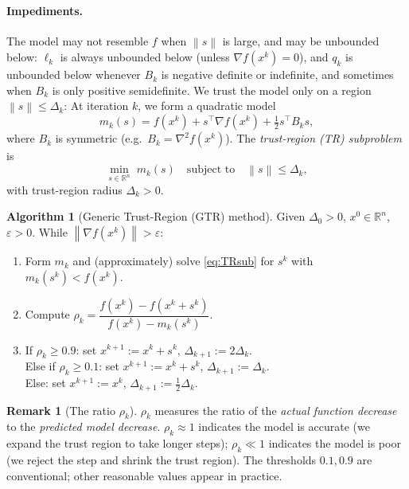 \documentclass[11pt,a4paper]{report}
\theoremstyle{plain}
\theoremstyle{definition}
\newtheorem{remark}[theorem]{Remark}
\newtheorem{algorithm}[theorem]{Algorithm}
\newcommand{\R}{\mathbb{R}}
\newcommand{\norm}[1]{\left\lVert#1\right\rVert}
\newcommand{\grad}{\nabla}
\newcommand{\hess}{\nabla^{2}}
\newcommand{\trans}{^{\top}}
\newcommand{\eps}{\varepsilon}
\begin{document}
\paragraph{Impediments.} The model may not resemble $f$ when $\norm{s}$ is large,
and may be unbounded below: $\ell_{k}$ is always unbounded below (unless
$\grad f(x^{k})=0$), and $q_{k}$ is unbounded below whenever $B_{k}$ is negative
definite or indefinite, and sometimes when $B_{k}$ is only positive
semidefinite. We trust the model only on a region $\norm{s}\le\Delta_{k}$:
At iteration $k$, we form a quadratic model
\begin{equation}\label{eq:TRmodel}
m_{k}(s)=f(x^{k})+s\trans\grad f(x^{k})+\tfrac12 s\trans B_{k}s,
\end{equation}
where $B_{k}$ is symmetric (e.g.\ $B_{k}=\hess f(x^{k})$). The
\emph{trust-region (TR) subproblem} is
\begin{equation}\label{eq:TRsub}\tag{TR}
\min_{s\in\R^{n}}\; m_{k}(s) \quad\text{subject to}\quad \norm{s}\le\Delta_{k},
\end{equation}
with trust-region radius $\Delta_{k}>0$.

\begin{algorithm}[Generic Trust-Region (GTR) method]\label{alg:GTR}
Given $\Delta_{0}>0$, $x^{0}\in\R^{n}$, $\eps>0$. While $\norm{\grad f(x^{k})}>\eps$:
\begin{enumerate}[leftmargin=2em,itemsep=0pt]
  \item Form $m_{k}$ and (approximately) solve \eqref{eq:TRsub} for $s^{k}$ with
        $m_{k}(s^{k})<f(x^{k})$.
  \item Compute $\rho_{k}=\dfrac{f(x^{k})-f(x^{k}+s^{k})}{f(x^{k})-m_{k}(s^{k})}$.
  \item If $\rho_{k}\ge 0.9$: set $x^{k+1}:=x^{k}+s^{k}$, $\Delta_{k+1}:=2\Delta_{k}$.\\
        Else if $\rho_{k}\ge 0.1$: set $x^{k+1}:=x^{k}+s^{k}$, $\Delta_{k+1}:=\Delta_{k}$.\\
        Else: set $x^{k+1}:=x^{k}$, $\Delta_{k+1}:=\tfrac12\Delta_{k}$.
\end{enumerate}
\end{algorithm}

\begin{remark}[The ratio $\rho_{k}$]
$\rho_{k}$ measures the ratio of the \emph{actual function decrease} to the
\emph{predicted model decrease}. $\rho_{k}\approx 1$ indicates the model is
accurate (we expand the trust region to take longer steps); $\rho_{k}\ll 1$
indicates the model is poor (we reject the step and shrink the trust region).
The thresholds $0.1,0.9$ are conventional; other reasonable values appear in
practice.
\end{remark}
\end{document}
